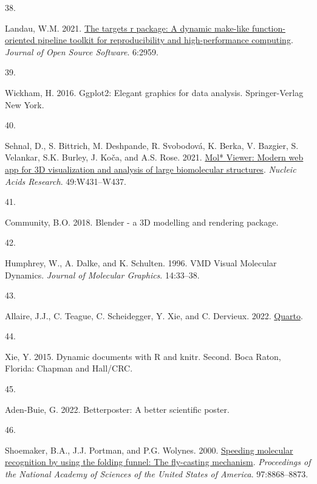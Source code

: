 \documentclass[
  twocolumn]{biophys-new-mod}
\newlength{\cslhangindent}
\newlength{\csllabelwidth}
\newlength{\cslentryspacingunit} %
\newenvironment{CSLReferences}[2] %
 {%
  \setlength{\parindent}{0pt}
  \ifodd #1
  \let\oldpar\par
  \def\par{\hangindent=\cslhangindent\oldpar}
  \fi
  \setlength{\parskip}{#2\cslentryspacingunit}
 }%
 {}
\newcommand{\CSLLeftMargin}[1]{\parbox[t]{\csllabelwidth}{#1}}
\newcommand{\CSLRightInline}[1]{\parbox[t]{\linewidth - \csllabelwidth}{#1}\break}
\begin{document}
\begin{CSLReferences}{0}{0}
\leavevmode{}%
\CSLLeftMargin{38. }%
\CSLRightInline{Landau, W.M. 2021.
\href{https://doi.org/10.21105/joss.02959}{The targets r package: A
dynamic make-like function-oriented pipeline toolkit for reproducibility
and high-performance computing}. \emph{Journal of Open Source Software}.
6:2959.}

\leavevmode{}%
\CSLLeftMargin{39. }%
\CSLRightInline{Wickham, H. 2016. Ggplot2: {Elegant} graphics for data
analysis. {Springer-Verlag New York}.}

\leavevmode{}%
\CSLLeftMargin{40. }%
\CSLRightInline{Sehnal, D., S. Bittrich, M. Deshpande, R. Svobodová, K.
Berka, V. Bazgier, S. Velankar, S.K. Burley, J. Koča, and A.S. Rose.
2021. \href{https://doi.org/10.1093/nar/gkab314}{Mol* {Viewer}: Modern
web app for {3D} visualization and analysis of large biomolecular
structures}. \emph{Nucleic Acids Research}. 49:W431--W437.}

\leavevmode{}%
\CSLLeftMargin{41. }%
\CSLRightInline{Community, B.O. 2018. Blender - a {3D} modelling and
rendering package.}

\leavevmode{}%
\CSLLeftMargin{42. }%
\CSLRightInline{Humphrey, W., A. Dalke, and K. Schulten. 1996. {VMD}
\textendash{} {Visual Molecular Dynamics}. \emph{Journal of Molecular
Graphics}. 14:33--38.}

\leavevmode{}%
\CSLLeftMargin{43. }%
\CSLRightInline{Allaire, J.J., C. Teague, C. Scheidegger, Y. Xie, and C.
Dervieux. 2022. \href{https://doi.org/10.5281/zenodo.5960048}{Quarto}.}

\leavevmode{}%
\CSLLeftMargin{44. }%
\CSLRightInline{Xie, Y. 2015. Dynamic documents with {R} and knitr.
Second. {Boca Raton, Florida}: {Chapman and Hall/CRC}.}

\leavevmode{}%
\CSLLeftMargin{45. }%
\CSLRightInline{Aden-Buie, G. 2022. Betterposter: {A} better scientific
poster.}

\leavevmode{}%
\CSLLeftMargin{46. }%
\CSLRightInline{Shoemaker, B.A., J.J. Portman, and P.G. Wolynes. 2000.
\href{https://doi.org/10.1073/pnas.160259697}{Speeding molecular
recognition by using the folding funnel: The fly-casting mechanism}.
\emph{Proceedings of the National Academy of Sciences of the United
States of America}. 97:8868--8873.}


\end{CSLReferences}
\end{document}
